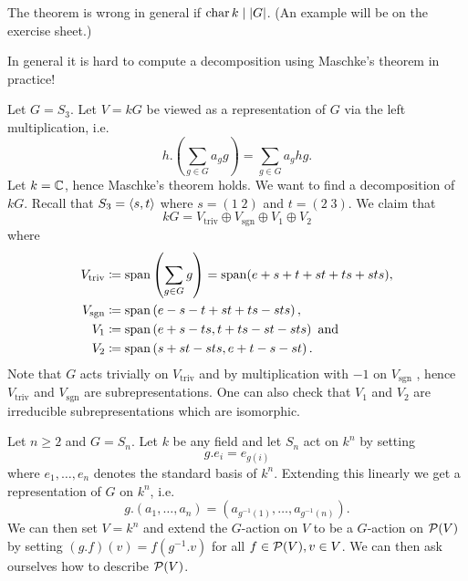 \begin{warn}
  The theorem is wrong in general if $\operatorname{char} k \mid |G|$.
  (An example will be on the exercise sheet.)
\end{warn}

\begin{expl}
  In general it is hard to compute a decomposition using Maschke’s theorem in practice!
  
  Let $G = S_3$.
  Let $V = kG$ be viewed as a representation of $G$ via the left multiplication, i.e.\
  \[
      h.\left( \sum_{g \in G} a_g g \right)
    = \sum_{g \in G} a_g hg.
  \]
  Let $k = \mathbb{C}$, hence Maschke’s theorem holds. We want to find a decomposition of $kG$. Recall that $S_3 = \left\langle s,t \right\rangle$ where $s = (1 \; 2)$ and $t = (2 \; 3)$. We claim that
  \[
      kG
    = V_{\text{triv}} \oplus V_{\text{sgn}} \oplus V_1 \oplus V_2
  \]
  where
  \begin{align*}
                V_{\text{triv}}
    &\coloneqq  \operatorname{span}\left(\sum_{g \in G} g \right) = \operatorname{span}(e+s+t+st+ts+sts),
    \\
                V_{\text{sgn}}
    &\coloneqq  \operatorname{span}\left(e-s-t+st+ts-sts\right),
    \\
                V_1
    &\coloneqq  \operatorname{span}\left(e+s-ts, t+ts-st-sts\right)
    \text{ and}
    \\
                V_2
    &\coloneqq  \operatorname{span}\left(s+st-sts,e+t-s-st\right).
  \end{align*}
  Note that $G$ acts trivially on $V_{\text{triv}}$ and by multiplication with $-1$ on $V_{\text{sgn}}$ , hence $V_{\text{triv}}$ and $V_{\text{sgn}}$ are subrepresentations.
  One can also check that $V_1$ and $V_2$ are irreducible subrepresentations which are isomorphic.
\end{expl}


\begin{expl}
  Let $n \geq 2$ and $G = S_n$.
  Let $k$ be any field and let $S_n$ act on $k^n$ by setting
  \[
      g.e_i
    = e_{g(i)}
  \]
  where $e_1, \dotsc, e_n$ denotes the standard basis of $k^n$.
  Extending this linearly we get a representation of $G$ on $k^n$, i.e.\
  \[
    g.(a_1, \dotsc, a_n)
    = \left( a_{g^{-1}(1)}, \dotsc, a_{g^{-1}(n)} \right).
  \]
  We can then set $V = k^n$ and extend the $G$-action on $V$ to be a $G$-action on $\mathcal{P}(V)$ by setting $(g.f)(v) = f(g^{-1}.v)$ for all $f \in \mathcal{P}(V), v \in V$.
  We can then ask ourselves how to describe $\mathcal{P}(V)$.
\end{expl}



